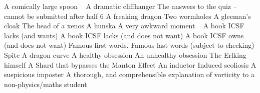 \begin{multicols}{2}
\begin{small}
\begin{tabbing}
            {A comically large spoon ~\FD}
            {A dramatic cliffhanger }
           {The answers to the quiz – cannot be submitted after half 6}
           {A freaking dragon}
           {Two wormholes}
           {A gleeman's cloak}
           {The head of a xenos}
           {A hunska}
            {A very awkward moment ~\FD}
          {A book ICSF lacks (and wants)}
          {A book ICSF lacks (and does not want)}
           {A book ICSF owns (and does not want)}
           {Famous first words.}
          {Famous last words (subject to checking)}
          {Spite}
            {A dragon curve}
           {A healthy obsession}
           {An unhealthy obsession}
           {The Erlking himself}
           {A Shard that bypasses the Manton Effect}
         {An inductor}
         {Induced scoliosis}
            {A suspicious imposter}
            {A thorough, and comprehensible explanation of vorticity to a non-physics/maths student}

\end{tabbing}
\end{small}
\end{multicols}
